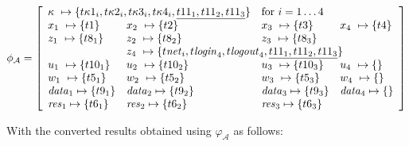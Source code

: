 \documentclass[10pt,a4paper,final,oneside,fleqn]{book}
\begin{document}
\noindent
$\phi_\mathcal{A}=\left[\begin{array}{llll}
\multicolumn{2}{l}{\kappa~\mapsto\{t\kappa 1_i, t\kappa 2_i, t\kappa 3_i, t\kappa 4_i, \underline{t11_1, t11_2, t11_3}\}}&\mbox{for }i=1\ldots 4&\\
x_1~\mapsto\{t1\}& x_2~\mapsto\{t2\}&x_3~\mapsto\{t3\}& x_4~\mapsto\{t4\}\\
z_1~\mapsto\{t8_1\}&z_2~\mapsto\{t8_2\}&z_3~\mapsto\{t8_3\}&\\ &\multicolumn{3}{l}{z_4~\mapsto\{t\mbox{{\itshape net\/}}_i,t\mbox{{\itshape login\/}}_4,t\mbox{{\itshape logout\/}}_4,\underline{t11_1, t11_2, t11_3}\}}\\
u_1~\mapsto\{t10_1\}&u_2~\mapsto\{t10_2\}&u_3~\mapsto\{t10_3\}&u_4~\mapsto\{\}\\
w_1~\mapsto\{t5_1\}&w_2~\mapsto\{t5_2\}&w_3~\mapsto\{t5_3\}&w_4~\mapsto\{\}\\
\mbox{{\itshape data\/}}_1\mapsto\{t9_1\}&\mbox{{\itshape data\/}}_2\mapsto\{t9_2\}&\mbox{{\itshape data\/}}_3\mapsto\{t9_3\}&\mbox{{\itshape data\/}}_4\mapsto\{\}\\
\mbox{{\itshape res\/}}_1\mapsto\{t6_1\}&\mbox{{\itshape res\/}}_2\mapsto\{t6_2\}&\mbox{{\itshape res\/}}_3\mapsto\{t6_3\}
\end{array}\right]$\vspace{6mm}

\noindent
With the converted results obtained using $\varphi_\mathcal{A}$ as follows:
\end{document}
